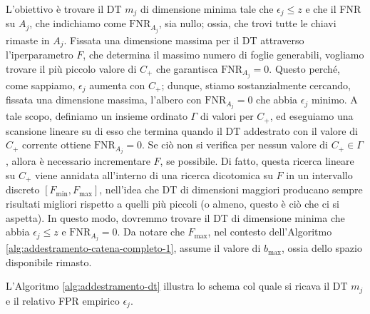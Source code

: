 L'obiettivo è trovare il DT $m_j$ di dimensione minima tale che $\epsilon_j \leq z$ e che il FNR su $A_j$, che indichiamo come $\text{FNR}_{A_j}$, sia nullo; ossia, che trovi tutte le chiavi rimaste in $A_j$.
Fissata una dimensione massima per il DT attraverso l'iperparametro $F$, che determina il massimo numero di foglie generabili, vogliamo trovare il più piccolo valore di $C_+$ che garantisca $\text{FNR}_{A_j}=0$. Questo perché, come sappiamo, $\epsilon_j$ aumenta con $C_+$; dunque, stiamo sostanzialmente cercando, fissata una dimensione massima, l'albero con $\text{FNR}_{A_j}=0$ che abbia $\epsilon_j$ minimo. A tale scopo, definiamo un insieme ordinato $\Gamma$ di valori per $C_+$, ed eseguiamo una scansione lineare su di esso che termina quando il DT addestrato con il valore di $C_+$ corrente ottiene $\text{FNR}_{A_j}=0$. Se ciò non si verifica per nessun valore di $C_+ \in \Gamma$, allora è necessario incrementare $F$, se possibile.
Di fatto, questa ricerca lineare su $C_+$ viene annidata all'interno di una ricerca dicotomica su $F$ in un intervallo discreto $[F_{\text{min}}, F_{\text{max}}]$, nell'idea che DT di dimensioni maggiori producano sempre risultati migliori rispetto a quelli più piccoli (o almeno, questo è ciò che ci si aspetta). In questo modo, dovremmo trovare il DT di dimensione minima che abbia $\epsilon_j \leq z$ e $\text{FNR}_{A_j}=0$. Da notare che $F_{\text{max}}$, nel contesto dell'Algoritmo \ref{alg:addestramento-catena-completo-1}, assume il valore di $b_{\text{max}}$, ossia dello spazio disponibile rimasto.

L’Algoritmo \ref{alg:addestramento-dt} illustra lo schema col quale si ricava il DT $m_j$ e il relativo FPR empirico $\epsilon_j$.

